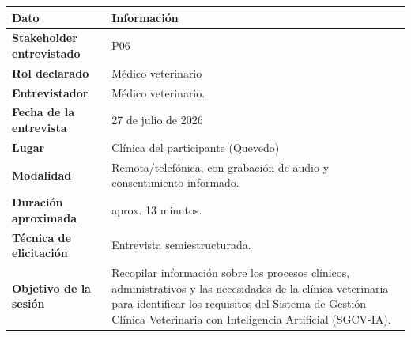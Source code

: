 \documentclass[
]{article}
\newcounter{none} %
\begin{document}
{\def\LTcaptype{none} %
\begin{longtable}[]{|
  >{\raggedright\arraybackslash}p{}|
  >{\raggedright\arraybackslash}p{}|}
\hline
\begin{minipage}[b]{\linewidth}\centering
\textbf{Dato}
\end{minipage} & \begin{minipage}[b]{\linewidth}\centering
\textbf{Información}
\end{minipage} \\
\hline
\endhead
\hline
\endlastfoot
\textbf{Stakeholder entrevistado} & \begin{minipage}[t]{\linewidth}\raggedright
P06
\end{minipage} \\
\hline
\textbf{Rol declarado} & \begin{minipage}[t]{\linewidth}\raggedright
Médico veterinario
\end{minipage} \\
\hline
\textbf{Entrevistador} & \begin{minipage}[t]{\linewidth}\raggedright
Médico veterinario.
\end{minipage} \\
\hline
\textbf{Fecha de la entrevista} & \begin{minipage}[t]{\linewidth}\raggedright
27 de julio de 2026
\end{minipage} \\
\hline
\textbf{Lugar} & \begin{minipage}[t]{\linewidth}\raggedright
Clínica del participante (Quevedo)
\end{minipage} \\
\hline
\textbf{Modalidad} & \begin{minipage}[t]{\linewidth}\raggedright
Remota/telefónica, con grabación de audio y consentimiento informado.
\end{minipage} \\
\hline
\textbf{Duración aproximada} & \begin{minipage}[t]{\linewidth}\raggedright
aprox. 13 minutos.
\end{minipage} \\
\hline
\textbf{Técnica de elicitación} & \begin{minipage}[t]{\linewidth}\raggedright
Entrevista semiestructurada.
\end{minipage} \\
\hline
\textbf{Objetivo de la sesión} & \begin{minipage}[t]{\linewidth}\raggedright
Recopilar información sobre los procesos clínicos, administrativos y las necesidades de la clínica veterinaria para identificar los requisitos del Sistema de Gestión Clínica Veterinaria con Inteligencia Artificial (SGCV-IA).
\end{minipage} \\
\hline
\end{longtable}
}
\end{document}
